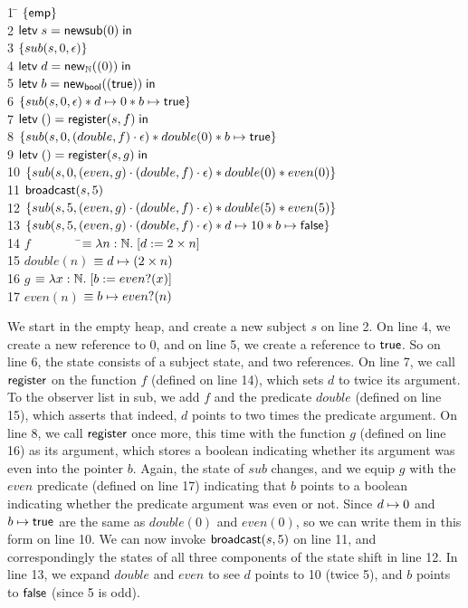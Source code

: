 \begin{tabbing}
1 \qquad \= 
$\{{\mathsf{emp}}\}$ \\
2 \> 
$\mathsf{letv}\;s = \mathsf{newsub}(0)\;\mathsf{in}\;$ \\
3 \> $\{{sub(s, 0, \epsilon)}\}$ \\
4 \> $\mathsf{letv}\;d = \mathsf{new}_{\mathbb{N}}((0))\;\mathsf{in}\;$ \\
5 \> $\mathsf{letv}\;b = \mathsf{new}_{\mathsf{bool}}((\mathsf{true}))\;\mathsf{in}\;$ \\
6 \> $\{{sub(s, 0, \epsilon) * d \mapsto 0 * b \mapsto \mathsf{true}}\}$\\
7 \> $\mathsf{letv}\;() = \mathsf{register}(s, f)\;\mathsf{in}\;$\\
8 \> $\{{sub(s, 0, (double, f)\cdot\epsilon) * double(0) * b \mapsto \mathsf{true}}\}$ \\
9 \> $\mathsf{letv}\;() = \mathsf{register}(s, g)\;\mathsf{in}\;$\\
10 \> $\{{sub(s, 0, (even, g)\cdot(double, f)\cdot\epsilon) * double(0) * even(0)}\}$ \\
11 \> $\mathsf{broadcast}(s, 5)$ \\
12 \> $\{{sub(s, 5, (even, g)\cdot(double, f)\cdot\epsilon) * double(5) * even(5)}\}$ \\
13 \> $\{{sub(s, 5, (even, g)\cdot(double, f)\cdot\epsilon) * d \mapsto 10 * b \mapsto \mathsf{false}}\}$ 
\\[0.5em]
14 \> $f \qquad \qquad $\=$\equiv \lambda n:\mathbb{N}.\; [d := 2 \times n]$ \\
15 \> $double(n)$ \> $\equiv d \mapsto (2 \times n)$ \\
16 \> $g$ \> $\equiv \lambda x:\mathbb{N}.\; [b := even?(x)]$ \\
17 \> $even(n)$ \> $\equiv b \mapsto even?(n)$ \\
\end{tabbing}

We start in the empty heap, and create a new subject $s$ on line 2.
On line 4, we create a new reference to $0$, and on line 5, we create
a reference to $\mathsf{true}$. So on line 6, the state consists of a
subject state, and two references.  On line 7, we call
$\mathsf{register}$ on the function $f$ (defined on line 14), which
sets $d$ to twice its argument. To the observer list in sub, we add
$f$ and the predicate $double$ (defined on line 15), which asserts
that indeed, $d$ points to two times the predicate argument. On line
8, we call $\mathsf{register}$ once more, this time with the function
$g$ (defined on line 16) as its argument, which stores a boolean
indicating whether its argument was even into the pointer $b$. Again,
the state of $sub$ changes, and we equip $g$ with the $even$ predicate
(defined on line 17) indicating that $b$ points to a boolean
indicating whether the predicate argument was even or not. Since $d
\mapsto 0$ and $b \mapsto \mathsf{true}$ are the same as
$double(0)$ and $even(0)$, so we can write them in this form on line
10.  We can now invoke $\mathsf{broadcast}(s, 5)$ on line 11, and
correspondingly the states of all three components of the state shift
in line 12.  In line 13, we expand $double$ and $even$ to see $d$
points to 10 (twice 5), and $b$ points to $\mathsf{false}$ (since 5
is odd).

